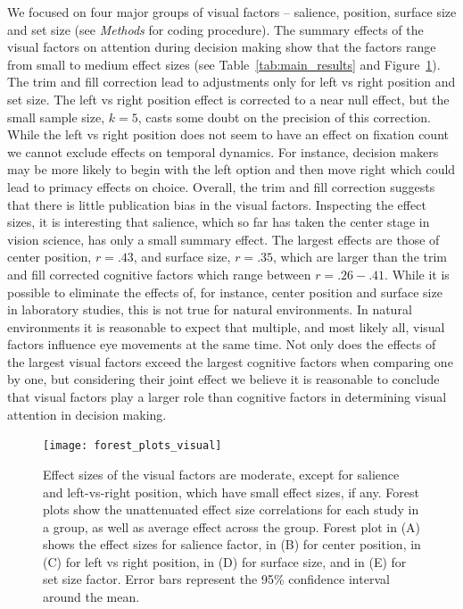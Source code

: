 We focused on four major groups of visual factors -- salience, position, surface size and set size (see \textit{Methods} for coding procedure). The summary effects of the visual factors on attention during decision making show that the factors range from small to medium effect sizes (see Table~\ref{tab:main_results} and Figure~\ref{fig:forest_plots_visual}). The trim and fill correction lead to adjustments only for left vs right position and set size. The left vs right position effect is corrected to a near null effect, but the small sample size, $k = 5$, casts some doubt on the precision of this correction. While the left vs right position does not seem to have an effect on fixation count we cannot exclude effects on temporal dynamics. For instance, decision makers may be more likely to begin with the left option and then move right \citep{fiedler2012} which could lead to primacy effects on choice. Overall, the trim and fill correction suggests that there is little publication bias in the visual factors. Inspecting the effect sizes, it is interesting that salience, which so far has taken the center stage in vision science, has only a small summary effect. The largest effects are those of center position, $r=.43$, and surface size, $r=.35$, which are larger than the trim and fill corrected cognitive factors which range between $r = .26-.41$. While it is possible to eliminate the effects of, for instance, center position and surface size in laboratory studies, this is not true for natural environments. In natural environments it is reasonable to expect that multiple, and most likely all, visual factors influence eye movements at the same time. Not only does the effects of the largest visual factors exceed the largest cognitive factors when comparing one by one, but considering their joint effect we believe it is reasonable to conclude that visual factors play a larger role than cognitive factors in determining visual attention in decision making. 



\begin{figure}[!h]
\texttt{[image: forest\_plots\_visual]}
\centering
\caption{Effect sizes of the visual factors are moderate, except for salience and left-vs-right position, which have small effect sizes, if any. Forest plots show the unattenuated effect size correlations for each study in a group, as well as average effect across the group. Forest plot in (A) shows the effect sizes for salience factor, in (B) for center position, in (C) for left vs right position, in  (D) for surface size, and in (E) for set size factor. Error bars represent the 95\% confidence interval around the mean.}
\label{fig:forest_plots_visual}
\end{figure}


